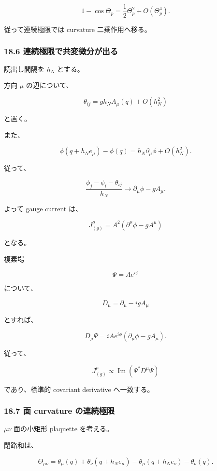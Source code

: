\documentclass[
  a4paper,
]{ltjsarticle}
\begin{document}
\[
1-\cos\Theta_p
=
\frac12\Theta_p^2
+
O(\Theta_p^4).
\tag{81}
\]

従って連続極限では curvature 二乗作用へ移る。

\subsubsection{18.6
連続極限で共変微分が出る}\label{ux9023ux7d9aux6975ux9650ux3067ux5171ux5909ux5faeux5206ux304cux51faux308b}

読出し間隔を \(h_N\) とする。

方向 \(\mu\) の辺について、

\[
\theta_{ij}
=
gh_NA_\mu(q)
+
O(h_N^2)
\tag{82}
\]

と置く。

また、

\[
\phi(q+h_Ne_\mu)-\phi(q)
=
h_N\partial_\mu\phi
+
O(h_N^2).
\]

従って、

\[
\frac{
\phi_j-\phi_i-\theta_{ij}
}{
h_N
}
\longrightarrow
\partial_\mu\phi-gA_\mu.
\]

よって gauge current は、

\[
\boxed{
J^\mu_{(g)}
=
A^2
\left(
\partial^\mu\phi
-
gA^\mu
\right)
}
\tag{83}
\]

となる。

複素場

\[
\Psi=Ae^{i\phi}
\]

について、

\[
D_\mu
=
\partial_\mu
-
igA_\mu
\]

とすれば、

\[
D_\mu\Psi
=
iAe^{i\phi}
\left(
\partial_\mu\phi-gA_\mu
\right).
\]

従って、

\[
\boxed{
J^\mu_{(g)}
\propto
\operatorname{Im}
\left(
\Psi^*D^\mu\Psi
\right)
}
\tag{84}
\]

であり、標準的 covariant derivative へ一致する。

\subsubsection{18.7 面 curvature
の連続極限}\label{ux9762-curvature-ux306eux9023ux7d9aux6975ux9650}

\(\mu\nu\) 面の小矩形 plaquette を考える。

閉路和は、

\[
\Theta_{\mu\nu}
=
\theta_\mu(q)
+
\theta_\nu(q+h_Ne_\mu)
-
\theta_\mu(q+h_Ne_\nu)
-
\theta_\nu(q).
\tag{85}
\]
\end{document}
